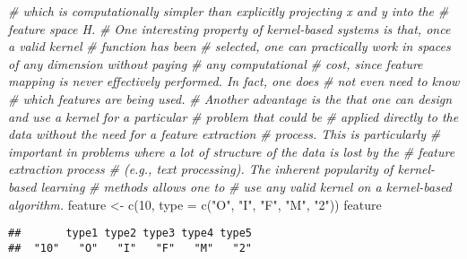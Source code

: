 \documentclass[
]{article}
\newenvironment{Shaded}{\begin{snugshade}}{\end{snugshade}}
\newcommand{\AttributeTok}[1]{\textcolor[rgb]{0.77,0.63,0.00}{#1}}
\newcommand{\CommentTok}[1]{\textcolor[rgb]{0.56,0.35,0.01}{\textit{#1}}}
\newcommand{\DecValTok}[1]{\textcolor[rgb]{0.00,0.00,0.81}{#1}}
\newcommand{\FunctionTok}[1]{\textcolor[rgb]{0.00,0.00,0.00}{#1}}
\newcommand{\NormalTok}[1]{#1}
\newcommand{\OtherTok}[1]{\textcolor[rgb]{0.56,0.35,0.01}{#1}}
\newcommand{\StringTok}[1]{\textcolor[rgb]{0.31,0.60,0.02}{#1}}
\begin{document}
\begin{Shaded}
\begin{Highlighting}[]
\CommentTok{\# which is computationally simpler than explicitly projecting x and y into the }
\CommentTok{\# feature space H.}
\CommentTok{\# One interesting property of kernel{-}based systems is that, once a valid kernel }
\CommentTok{\# function has been}
\CommentTok{\# selected, one can practically work in spaces of any dimension without paying }
\CommentTok{\# any computational}
\CommentTok{\# cost, since feature mapping is never effectively performed. In fact, one does }
\CommentTok{\# not even need to know}
\CommentTok{\# which features are being used.}
\CommentTok{\# Another advantage is the that one can design and use a kernel for a particular }
\CommentTok{\# problem that could be}
\CommentTok{\# applied directly to the data without the need for a feature extraction }
\CommentTok{\# process. This is particularly}
\CommentTok{\# important in problems where a lot of structure of the data is lost by the }
\CommentTok{\# feature extraction process}
\CommentTok{\# (e.g., text processing). The inherent popularity of kernel{-}based learning }
\CommentTok{\# methods allows one to}
\CommentTok{\# use any valid kernel on a kernel{-}based algorithm.}
\NormalTok{feature }\OtherTok{\textless{}{-}} \FunctionTok{c}\NormalTok{(}\DecValTok{10}\NormalTok{, }\AttributeTok{type =} \FunctionTok{c}\NormalTok{(}\StringTok{"O"}\NormalTok{, }\StringTok{"I"}\NormalTok{, }\StringTok{"F"}\NormalTok{, }\StringTok{"M"}\NormalTok{, }\StringTok{"2"}\NormalTok{))}
\NormalTok{feature}
\end{Highlighting}
\end{Shaded}

\begin{verbatim}
##       type1 type2 type3 type4 type5 
##  "10"   "O"   "I"   "F"   "M"   "2"
\end{verbatim}
\end{document}
